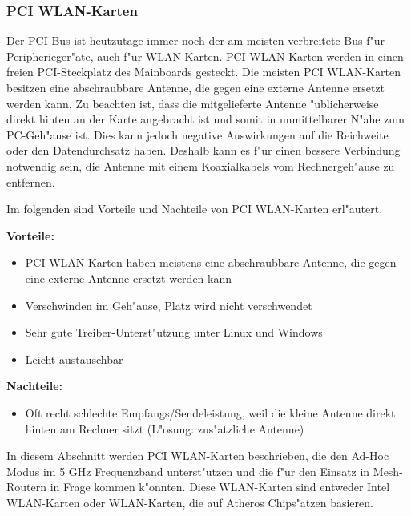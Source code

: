 \subsubsection{PCI WLAN-Karten}

Der PCI-Bus ist heutzutage immer noch der am meisten verbreitete Bus
f"ur Peripherieger"ate, auch f"ur WLAN-Karten. PCI WLAN-Karten werden in
einen freien PCI-Steckplatz des Mainboards gesteckt. Die meisten
PCI WLAN-Karten besitzen eine abschraubbare Antenne, die gegen eine
externe Antenne ersetzt werden kann. Zu beachten ist, dass die
mitgelieferte Antenne "ublicherweise direkt hinten an der Karte angebracht
ist und somit in unmittelbarer N"ahe zum PC-Geh"ause ist. Dies kann
jedoch negative Auswirkungen auf die Reichweite oder den Datendurchsatz
haben. Deshalb kann es f"ur einen bessere Verbindung notwendig sein,
die Antenne mit einem Koaxialkabels vom Rechnergeh"ause zu entfernen.

Im folgenden sind Vorteile und Nachteile von PCI WLAN-Karten erl"autert.

\textbf{Vorteile:}

\begin{itemize}
\item PCI WLAN-Karten haben meistens eine abschraubbare Antenne,
die gegen eine externe Antenne ersetzt werden kann
\item Verschwinden im Geh"ause, Platz wird nicht verschwendet 
\item Sehr gute Treiber-Unterst"utzung unter Linux und Windows
\item Leicht austauschbar
\end{itemize}

\textbf{Nachteile:}

\begin{itemize}
\item Oft recht schlechte Empfangs/Sendeleistung, weil die kleine Antenne
direkt hinten am Rechner sitzt (L"osung: zus"atzliche Antenne)
\end{itemize}

In diesem Abschnitt werden PCI WLAN-Karten beschrieben, die den Ad-Hoc
Modus im 5 GHz Frequenzband unterst"utzen und die f"ur den Einsatz in
Mesh-Routern in Frage kommen k"onnten. Diese WLAN-Karten sind entweder
Intel WLAN-Karten oder WLAN-Karten, die auf Atheros Chips"atzen basieren.

